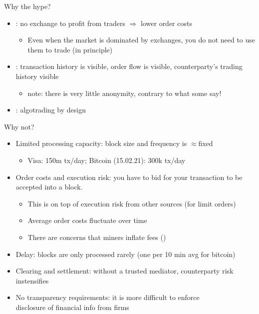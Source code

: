 \documentclass[english,10pt
,aspectratio=169
]{beamer}
\begin{document}
\begin{frame}{Why the hype?}
	\begin{itemize}
		\item {}: no exchange to profit from traders $\Rightarrow$ lower order costs
		\begin{itemize}
			\item Even when the market is dominated by exchanges, you do not need to use them to trade (in principle)
		\end{itemize}
		\item {}: transaction history is visible, order flow is visible, counterparty's trading history visible
		\begin{itemize}
			\item note: there is very little anonymity, contrary to what some say!
		\end{itemize}
		\item {}: algotrading by design
	\end{itemize}
\end{frame}


\begin{frame}[label=problems]{Why not?}
	\begin{itemize}
		\item \alert{Limited processing capacity}: block size and frequency is $\approx$fixed
		\begin{itemize}
			\item Visa: 150m tx/day; Bitcoin (15.02.21): 300k tx/day
		\end{itemize}
		\item \alert{Order costs} and \alert{execution risk}: you have to bid for your transaction to be accepted into a block.
		\begin{itemize}
			\item This is on top of execution risk from other sources (for limit orders)
			\item Average order costs fluctuate over time \hyperlink{bcfee}{}
			\item There are concerns that miners inflate fees (\cite{lehar_miner_2020})
		\end{itemize}
		\item \alert{Delay}: blocks are only processed rarely (one per 10 min avg for bitcoin) \hyperlink{blocktime}{}
		\item \alert{Clearing and settlement}: without a trusted mediator, counterparty risk instensifies
		\item \alert{No transparency requirements}: it is more difficult to enforce \\ disclosure of financial info from firms
	\end{itemize}
\end{frame}
\end{document}
